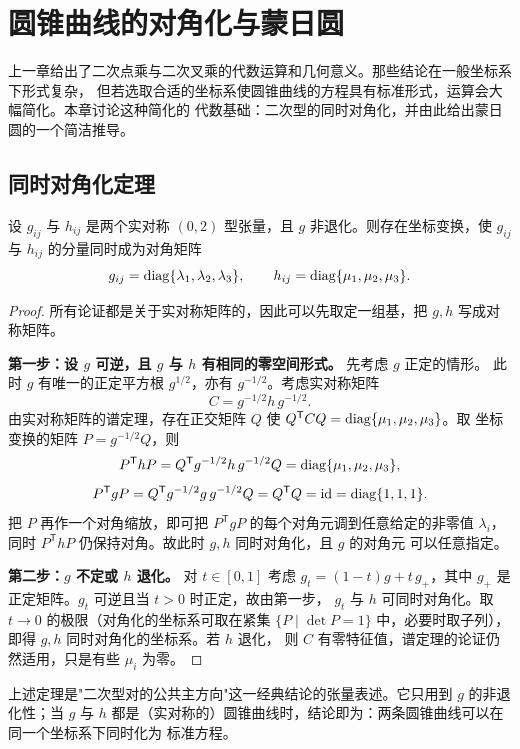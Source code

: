 \chapter{圆锥曲线的对角化与蒙日圆}

上一章给出了二次点乘与二次叉乘的代数运算和几何意义。那些结论在一般坐标系下形式复杂，
但若选取合适的坐标系使圆锥曲线的方程具有标准形式，运算会大幅简化。本章讨论这种简化的
代数基础：二次型的同时对角化，并由此给出蒙日圆的一个简洁推导。

\section{同时对角化定理}

\begin{theorem}[同时对角化]
\label{thm:simul}
设 $g_{ij}$ 与 $h_{ij}$ 是两个实对称 $(0,2)$ 型张量，且 $g$ 非退化。则存在坐标变换，使
$g_{ij}$ 与 $h_{ij}$ 的分量同时成为对角矩阵
\[
g_{ij}=\operatorname{diag}\{\lambda_1,\lambda_2,\lambda_3\},\qquad
h_{ij}=\operatorname{diag}\{\mu_1,\mu_2,\mu_3\}.
\]
\end{theorem}

\begin{proof}
所有论证都是关于实对称矩阵的，因此可以先取定一组基，把 $g,h$ 写成对称矩阵。

\textbf{第一步：设 $g$ 可逆，且 $g$ 与 $h$ 有相同的零空间形式。} 先考虑 $g$ 正定的情形。
此时 $g$ 有唯一的正定平方根 $g^{1/2}$，亦有 $g^{-1/2}$。考虑实对称矩阵
\[
C=g^{-1/2}h\,g^{-1/2}.
\]
由实对称矩阵的谱定理，存在正交矩阵 $Q$ 使 $Q^{\mathsf T}CQ=\operatorname{diag}\{\mu_1,\mu_2,\mu_3\}$。取
坐标变换的矩阵 $P=g^{-1/2}Q$，则
\[
P^{\mathsf T}hP=Q^{\mathsf T}g^{-1/2}h\,g^{-1/2}Q=\operatorname{diag}\{\mu_1,\mu_2,\mu_3\},
\]
\[
P^{\mathsf T}gP=Q^{\mathsf T}g^{-1/2}g\,g^{-1/2}Q=Q^{\mathsf T}Q=\mathrm{id}
=\operatorname{diag}\{1,1,1\}.
\]
把 $P$ 再作一个对角缩放，即可把 $P^{\mathsf T}gP$ 的每个对角元调到任意给定的非零值
$\lambda_i$，同时 $P^{\mathsf T}hP$ 仍保持对角。故此时 $g,h$ 同时对角化，且 $g$ 的对角元
可以任意指定。

\textbf{第二步：$g$ 不定或 $h$ 退化。} 对 $t\in[0,1]$ 考虑
$g_t=(1-t)g+t\,g_+$，其中 $g_+$ 是正定矩阵。$g_t$ 可逆且当 $t>0$ 时正定，故由第一步，
$g_t$ 与 $h$ 可同时对角化。取 $t\to0$ 的极限（对角化的坐标系可取在紧集
$\{P\mid \det P=1\}$ 中，必要时取子列），即得 $g,h$ 同时对角化的坐标系。若 $h$ 退化，
则 $C$ 有零特征值，谱定理的论证仍然适用，只是有些 $\mu_i$ 为零。
\end{proof}

\begin{remark}
上述定理是"二次型对的公共主方向"这一经典结论的张量表述。它只用到 $g$ 的非退化性；当 $g$
与 $h$ 都是（实对称的）圆锥曲线时，结论即为：两条圆锥曲线可以在同一个坐标系下同时化为
标准方程。
\end{remark}

